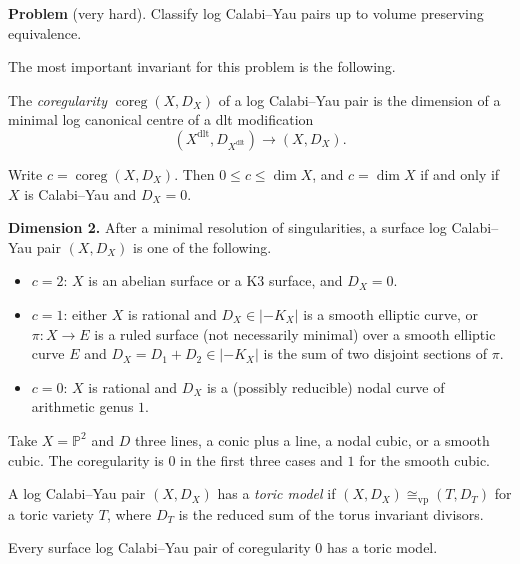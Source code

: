 \medskip\noindent
{\bf Problem} (very hard). Classify log
Calabi--Yau pairs up to volume preserving
equivalence.

The most important invariant for this
problem is the following.

\begin{definition}
\label{definition-alves-coregularity}
The \emph{coregularity}
$\operatorname{coreg}(X,D_X)$ of a log
Calabi--Yau pair is the dimension of a
minimal log canonical centre of a dlt
modification
$$
(X^{\operatorname{dlt}},
D_{X^{\operatorname{dlt}}})
\to (X,D_X).
$$
\end{definition}

\begin{remark}
\label{remark-alves-coregularity-range}
Write $c=\operatorname{coreg}(X,D_X)$. Then
$0\leq c\leq \dim X$, and $c=\dim X$ if and
only if $X$ is Calabi--Yau and $D_X=0$.
\end{remark}

\medskip\noindent
{\bf Dimension 2.} After a minimal
resolution of singularities, a surface log
Calabi--Yau pair $(X,D_X)$ is one of the
following.
\begin{itemize}
\item $c=2$: $X$ is an abelian surface or a
K3 surface, and $D_X=0$.
\item $c=1$: either $X$ is rational and
$D_X\in |-K_X|$ is a smooth elliptic curve,
or $\pi\colon X\to E$ is a ruled surface
(not necessarily minimal) over a smooth
elliptic curve $E$ and $D_X=D_1+D_2\in
|-K_X|$ is the sum of two disjoint sections
of $\pi$.
\item $c=0$: $X$ is rational and $D_X$ is a
(possibly reducible) nodal curve of
arithmetic genus $1$.
\end{itemize}

\begin{example}
\label{example-alves-plane}
Take $X=\mathbb{P}^2$ and $D$ three lines, a
conic plus a line, a nodal cubic, or a
smooth cubic. The coregularity is $0$ in
the first three cases and $1$ for the
smooth cubic.
\end{example}

\begin{definition}
\label{definition-alves-toric-model}
A log Calabi--Yau pair $(X,D_X)$ has a
\emph{toric model} if
$(X,D_X)\cong_{\operatorname{vp}}(T,D_T)$
for a toric variety $T$, where $D_T$ is the
reduced sum of the torus invariant
divisors.
\end{definition}

\begin{theorem}
\label{theorem-alves-ghk}
Every surface log Calabi--Yau pair of
coregularity $0$ has a toric model.
\end{theorem}

